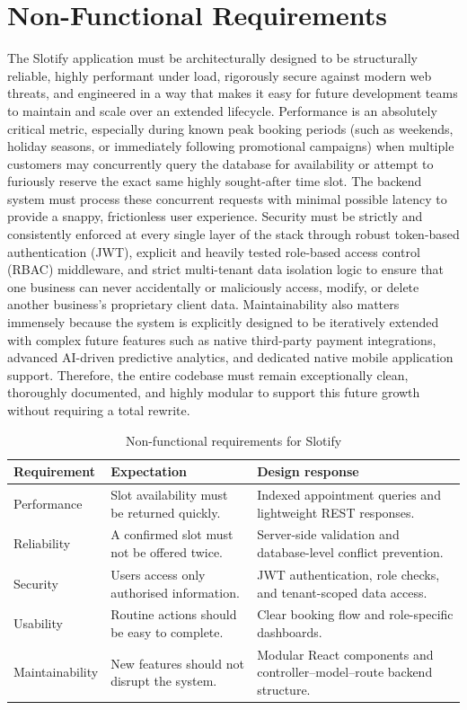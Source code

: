 \section{Non-Functional Requirements}
The Slotify application must be architecturally designed to be structurally reliable, highly performant under load, rigorously secure against modern web threats, and engineered in a way that makes it easy for future development teams to maintain and scale over an extended lifecycle. Performance is an absolutely critical metric, especially during known peak booking periods (such as weekends, holiday seasons, or immediately following promotional campaigns) when multiple customers may concurrently query the database for availability or attempt to furiously reserve the exact same highly sought-after time slot. The backend system must process these concurrent requests with minimal possible latency to provide a snappy, frictionless user experience. Security must be strictly and consistently enforced at every single layer of the stack through robust token-based authentication (JWT), explicit and heavily tested role-based access control (RBAC) middleware, and strict multi-tenant data isolation logic to ensure that one business can never accidentally or maliciously access, modify, or delete another business's proprietary client data. Maintainability also matters immensely because the system is explicitly designed to be iteratively extended with complex future features such as native third-party payment integrations, advanced AI-driven predictive analytics, and dedicated native mobile application support. Therefore, the entire codebase must remain exceptionally clean, thoroughly documented, and highly modular to support this future growth without requiring a total rewrite.

\begin{table}[h]
\centering
\caption{Non-functional requirements for Slotify}
\begin{tabular}{|p{3cm}|p{4cm}|p{4cm}|}
\hline
\textbf{Requirement} & \textbf{Expectation} & \textbf{Design response} \\
\hline
Performance & Slot availability must be returned quickly. & Indexed appointment queries and lightweight REST responses. \\
\hline
Reliability & A confirmed slot must not be offered twice. & Server-side validation and database-level conflict prevention. \\
\hline
Security & Users access only authorised information. & JWT authentication, role checks, and tenant-scoped data access. \\
\hline
Usability & Routine actions should be easy to complete. & Clear booking flow and role-specific dashboards. \\
\hline
Maintainability & New features should not disrupt the system. & Modular React components and controller--model--route backend structure. \\
\hline
\end{tabular}
\end{table}

